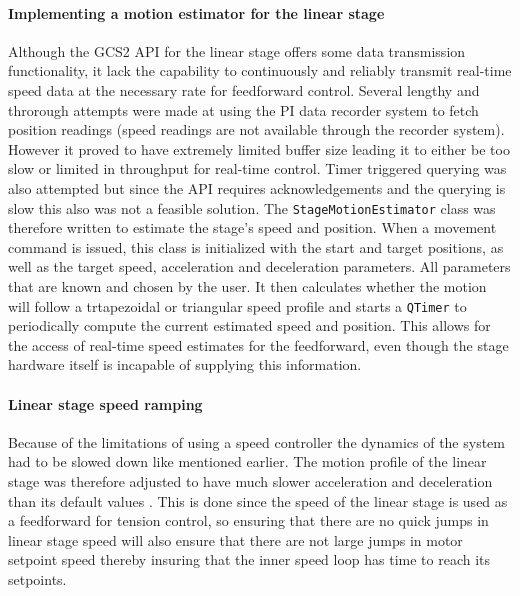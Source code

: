 \paragraph*{Implementing a motion estimator for the linear stage}
Although the GCS2 API for the linear stage offers some data transmission functionality, it lack the capability to continuously and reliably transmit real-time speed data at the necessary rate for feedforward control. Several lengthy and throrough attempts were made at using the PI data recorder system to fetch position readings (speed readings are not available through the recorder system). However it proved to have extremely limited buffer size leading it to either be too slow or limited in throughput for real-time control. Timer triggered querying was also attempted but since the API requires acknowledgements and the querying is slow this also was not a feasible solution.
\newline \newline 
The \texttt{StageMotionEstimator} class was therefore written to estimate the stage's speed and position. When a movement command is issued, this class is initialized with the start and target positions, as well as the target speed, acceleration and deceleration parameters. All parameters that are known and chosen by the user. It then calculates whether the motion will follow a trtapezoidal or triangular speed profile and starts a \texttt{QTimer} to periodically compute the current estimated speed and position. This allows for the access of real-time speed estimates for the feedforward, even though the stage hardware itself is incapable of supplying this information.


\paragraph*{Linear stage speed ramping}
Because of the limitations of using a speed controller the dynamics of the system had to be slowed down like mentioned earlier. The motion profile of the linear stage was therefore adjusted to have much slower acceleration and deceleration than its default values . This is done since the speed of the linear stage is used as a feedforward for tension control, so ensuring that there are no quick jumps in linear stage speed will also ensure that there are not large jumps in motor setpoint speed thereby insuring that the inner speed loop has time to reach its setpoints.


